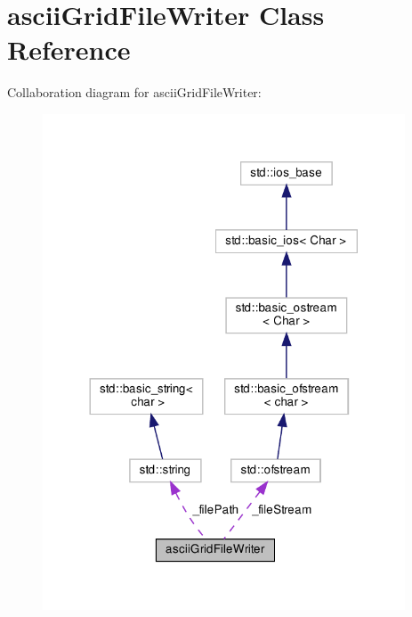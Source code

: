 \hypertarget{classasciiGridFileWriter}{}\section{ascii\+Grid\+File\+Writer Class Reference}
\label{classasciiGridFileWriter}


Collaboration diagram for ascii\+Grid\+File\+Writer\+:\nopagebreak
\begin{figure}[H]
\begin{center}
\leavevmode
\includegraphics[width=305pt]{classasciiGridFileWriter__coll__graph}
\end{center}
\end{figure}
